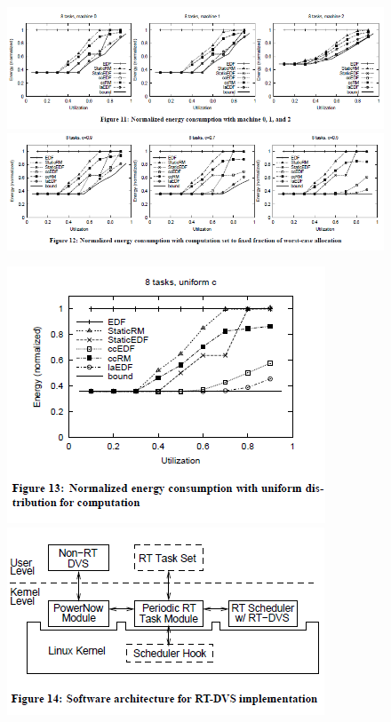 \documentclass[11pt
  , a4paper
  , article
  , oneside
]{memoir}
\begin{document}
\begin{figure}[h!]
	\centering
	\includegraphics{./images/fig11.png}
	\includegraphics{./images/fig12.png}
\end{figure}
\begin{figure}[h!]
	\centering
	\includegraphics{./images/fig13.png}
	\includegraphics{./images/fig14.png}
\end{figure}
\end{document}
